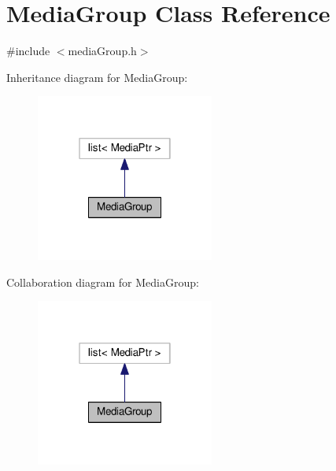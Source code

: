 \hypertarget{classMediaGroup}{}\section{Media\+Group Class Reference}
\label{classMediaGroup}


{\ttfamily \#include $<$media\+Group.\+h$>$}



Inheritance diagram for Media\+Group\+:\nopagebreak
\begin{figure}[H]
\begin{center}
\leavevmode
\includegraphics[width=166pt]{classMediaGroup__inherit__graph}
\end{center}
\end{figure}


Collaboration diagram for Media\+Group\+:\nopagebreak
\begin{figure}[H]
\begin{center}
\leavevmode
\includegraphics[width=166pt]{classMediaGroup__coll__graph}
\end{center}
\end{figure}
